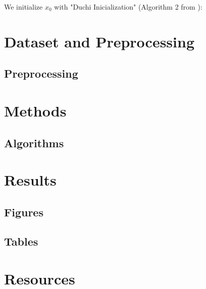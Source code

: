 \documentclass[11pt,letterpaper]{article}
\numberwithin{equation}{section} %
\numberwithin{figure}{section} %
\numberwithin{table}{section} %
\begin{document}
We initialize $x_0$ with "Duchi Inicialization" (Algorithm 2 from \cite{Duchi2017PhaseRetrival}):


\section{Dataset and Preprocessing} %
\label{sec:dataset_and_preprocessing}

\subsection{Preprocessing} %
\label{sub:preprocessing}

\section{Methods} %
\label{sec:methods}

\subsection{Algorithms} %
\label{sub:algorithms}

\section{Results} %
\label{sec:results}

\subsection{Figures} %
\label{sub:figures}


\subsection{Tables} 


\clearpage
\appendix
\section{Resources}



\clearpage
\end{document}
